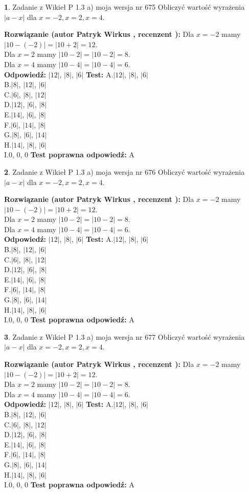 \documentclass[12pt, a4paper]{article}
\theoremstyle{definition} %
\newtheorem{zad}{}
\newcommand{\zadStart}[1]{\begin{zad}#1\newline}
\newcommand{\zadStop}{\end{zad}}
\newcommand{\rozwStart}[2]{\noindent \textbf{Rozwiązanie (autor #1 , recenzent #2): }\newline}
\newcommand{\rozwStop}{\newline}
\newcommand{\odpStart}{\noindent \textbf{Odpowiedź:}\newline}
\newcommand{\odpStop}{\newline}
\newcommand{\testStart}{\noindent \textbf{Test:}\newline}
\newcommand{\testStop}{\newline}
\newcommand{\kluczStart}{\noindent \textbf{Test poprawna odpowiedź:}\newline}
\newcommand{\kluczStop}{\newline}
\begin{document}
\zadStart{Zadanie z Wikieł P 1.3 a) moja wersja nr 675}
Obliczyć wartość wyrażenia $|a - x|$ dla $x=-2,x=2,x=4$.
\zadStop
\rozwStart{Patryk Wirkus}{}
Dla $x = -2$ mamy $|10 - (-2)| = |10 + 2| = 12$.\\
Dla $x = 2$ mamy $|10 - 2| = |10 - 2| = 8$.\\
Dla $x = 4$ mamy $|10 - 4| = |10 - 4| = 6$.\\
\rozwStop
\odpStart
$|12|$, $|8|$, $|6|$
\odpStop
\testStart
A.$|12|$, $|8|$, $|6|$\\
B.$|8|$, $|12|$, $|6|$\\
C.$|6|$, $|8|$, $|12|$\\
D.$|12|$, $|6|$, $|8|$\\
E.$|14|$, $|6|$, $|8|$\\
F.$|6|$, $|14|$, $|8|$\\
G.$|8|$, $|6|$, $|14|$\\
H.$|14|$, $|8|$, $|6|$\\
I.$0$, $0$, $0$
\testStop
\kluczStart
A
\kluczStop



\zadStart{Zadanie z Wikieł P 1.3 a) moja wersja nr 676}
Obliczyć wartość wyrażenia $|a - x|$ dla $x=-2,x=2,x=4$.
\zadStop
\rozwStart{Patryk Wirkus}{}
Dla $x = -2$ mamy $|10 - (-2)| = |10 + 2| = 12$.\\
Dla $x = 2$ mamy $|10 - 2| = |10 - 2| = 8$.\\
Dla $x = 4$ mamy $|10 - 4| = |10 - 4| = 6$.\\
\rozwStop
\odpStart
$|12|$, $|8|$, $|6|$
\odpStop
\testStart
A.$|12|$, $|8|$, $|6|$\\
B.$|8|$, $|12|$, $|6|$\\
C.$|6|$, $|8|$, $|12|$\\
D.$|12|$, $|6|$, $|8|$\\
E.$|14|$, $|6|$, $|8|$\\
F.$|6|$, $|14|$, $|8|$\\
G.$|8|$, $|6|$, $|14|$\\
H.$|14|$, $|8|$, $|6|$\\
I.$0$, $0$, $0$
\testStop
\kluczStart
A
\kluczStop



\zadStart{Zadanie z Wikieł P 1.3 a) moja wersja nr 677}
Obliczyć wartość wyrażenia $|a - x|$ dla $x=-2,x=2,x=4$.
\zadStop
\rozwStart{Patryk Wirkus}{}
Dla $x = -2$ mamy $|10 - (-2)| = |10 + 2| = 12$.\\
Dla $x = 2$ mamy $|10 - 2| = |10 - 2| = 8$.\\
Dla $x = 4$ mamy $|10 - 4| = |10 - 4| = 6$.\\
\rozwStop
\odpStart
$|12|$, $|8|$, $|6|$
\odpStop
\testStart
A.$|12|$, $|8|$, $|6|$\\
B.$|8|$, $|12|$, $|6|$\\
C.$|6|$, $|8|$, $|12|$\\
D.$|12|$, $|6|$, $|8|$\\
E.$|14|$, $|6|$, $|8|$\\
F.$|6|$, $|14|$, $|8|$\\
G.$|8|$, $|6|$, $|14|$\\
H.$|14|$, $|8|$, $|6|$\\
I.$0$, $0$, $0$
\testStop
\kluczStart
A
\kluczStop
\end{document}
